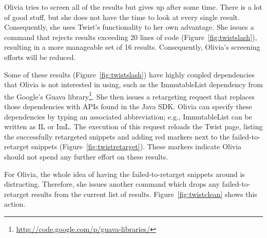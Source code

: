 Olivia tries to screen all of the results but gives up after some time. There is a lot of good stuff, but she does not have the time to look at every single result. Consequently, she uses Twist's functionality to her own advantage. She issues a command that rejects results exceeding 20 lines of code (Figure~\ref{fig:twistslash}), resulting in a more manageable set of 16 results. Consequently, Olivia's screening efforts will be reduced.


Some of these results (Figure~\ref{fig:twistslash}) have highly coupled dependencies that Olivia is not interested in using, such as the ImmutableList dependency from the Google's Guava library\footnote{\url{http://code.google.com/p/guava-libraries/}}. She then issues a retargeting request that replaces those dependencies with APIs found in the Java SDK. Olivia can specify these dependencies by typing an associated abbreviation; e.g., ImmutableList can be written as IL or ImL. The execution of this request reloads the Twist page, listing the successfully retargeted snippets and adding red markers next to the failed-to-retarget snippets (Figure~\ref{fig:twistretarget}). These markers indicate Olivia should not spend any further effort on these results. 


For Olivia, the whole idea of having the failed-to-retarget snippets around is distracting. Therefore, she issues another command which drops any failed-to-retarget results from the current list of results. Figure~\ref{fig:twistclean} shows this action. 


